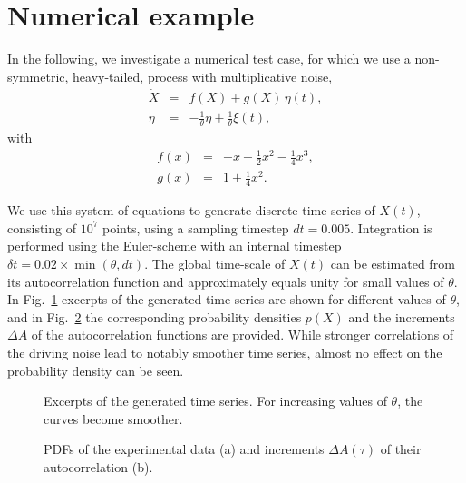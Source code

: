 \documentclass[aps,twocolumn,superscriptaddress,showpacs,showkeys]{revtex4}
\begin{document}
\section{Numerical example}
\label{sec_example}


\noindent In the following, we investigate a numerical test case, for which we use a non-symmetric, heavy-tailed,
process with multiplicative noise,
%
\begin{eqnarray}
\dot X &=& f(X) +g(X)\,\eta(t),\\
\dot \eta &=& -\frac{1}{\theta} \eta+\frac{1}{\theta}\xi(t),
\end{eqnarray}
\noindent with
%
\begin{eqnarray}
f(x) &=& -x+\frac{1}{2}x^2-\frac{1}{4}x^3,\\
g(x) &=& 1+\frac{1}{4}x^2.
\end{eqnarray}

\noindent We use this system of equations to generate discrete time series of $X(t)$, consisting of $10^7$ points, using
a sampling timestep $dt\!=\!0.005$.
Integration is performed using the Euler-scheme with an internal timestep $\delta t\!=\!0.02\times\min(\theta,dt)$.
The global time-scale of $X(t)$ can be estimated from its autocorrelation function and approximately equals unity for
small values of $\theta$.
In Fig.~\ref{fig1} excerpts of the generated time series are shown for different values of $\theta$, and in
Fig.~\ref{fig2} the corresponding probability densities $p(X)$ and the increments $\Delta A$ of the autocorrelation functions
are provided. While stronger correlations of the driving noise lead to notably smoother time series, almost no effect on
the probability density can be seen.
%
\begin{figure}[h]
  \caption{\protect Excerpts of the generated time series. For increasing values of $\theta$, the curves become smoother.
  }\label{fig1}
\end{figure}
%
\begin{figure}[h]
  \caption{\protect PDFs of the experimental data  (a) and increments $\Delta A(\tau)$ of their autocorrelation (b).
  }\label{fig2}
\end{figure}
\end{document}
